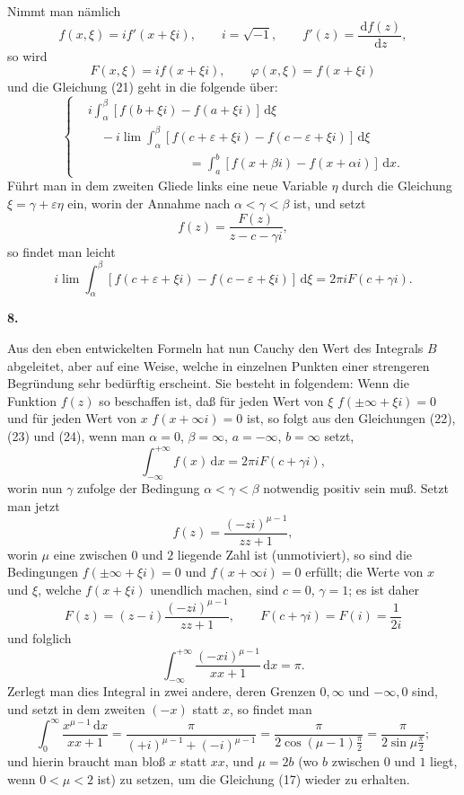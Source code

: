 \documentclass[11pt]{article}
\newcommand{\dd}{\,\mathrm d}
\newcommand{\art}[1]{\bigskip\begin{center}\large\bfseries #1.\end{center}\nopagebreak}
\begin{document}
Nimmt man nämlich
\[
f(x,\xi)=i f'(x+\xi i), \qquad i=\sqrt{-1}, \qquad f'(z)=\frac{\dd f(z)}{\dd z},
\]
so wird
\[
F(x,\xi)=i f(x+\xi i),\qquad \varphi(x,\xi)=f(x+\xi i)
\]
und die Gleichung (21) geht in die folgende über:
\begin{equation}
\left\{
\begin{aligned}
&i\int_\alpha^\beta [f(b+\xi i)-f(a+\xi i)]\dd\xi \\
&\quad -i\lim\int_\alpha^\beta [f(c+\varepsilon+\xi i)-f(c-\varepsilon+\xi i)]\dd\xi \\
&\hspace{8em}=\int_a^b [f(x+\beta i)-f(x+\alpha i)]\dd x .
\end{aligned}
\right.
\tag{22}
\end{equation}
Führt man in dem zweiten Gliede links eine neue Variable $\eta$ durch die Gleichung $\xi=\gamma+\varepsilon\eta$ ein, worin der Annahme nach $\alpha<\gamma<\beta$ ist, und setzt
\begin{equation}
f(z)=\frac{F(z)}{z-c-\gamma i},
\tag{23}
\end{equation}
so findet man leicht
\begin{equation}
i\lim\int_\alpha^\beta [f(c+\varepsilon+\xi i)-f(c-\varepsilon+\xi i)]\dd\xi=2\pi i F(c+\gamma i).
\tag{24}
\end{equation}

\art{8}

Aus den eben entwickelten Formeln hat nun Cauchy den Wert des Integrals $B$ abgeleitet, aber auf eine Weise, welche in einzelnen Punkten einer strengeren Begründung sehr bedürftig erscheint. Sie besteht in folgendem: Wenn die Funktion $f(z)$ so beschaffen ist, daß für jeden Wert von $\xi$ $f(\pm\infty+\xi i)=0$ und für jeden Wert von $x$ $f(x+\infty i)=0$ ist, so folgt aus den Gleichungen (22), (23) und (24), wenn man $\alpha=0$, $\beta=\infty$, $a=-\infty$, $b=\infty$ setzt,
\begin{equation}
\int_{-\infty}^{+\infty} f(x)\dd x=2\pi i F(c+\gamma i),
\tag{25}
\end{equation}
worin nun $\gamma$ zufolge der Bedingung $\alpha<\gamma<\beta$ notwendig positiv sein muß. Setzt man jetzt
\[
f(z)=\frac{(-zi)^{\mu-1}}{zz+1},
\]
worin $\mu$ eine zwischen $0$ und $2$ liegende Zahl ist (unmotiviert), so sind die Bedingungen $f(\pm\infty+\xi i)=0$ und $f(x+\infty i)=0$ erfüllt; die Werte von $x$ und $\xi$, welche $f(x+\xi i)$ unendlich machen, sind $c=0$, $\gamma=1$; es ist daher
\[
F(z)=(z-i)\frac{(-zi)^{\mu-1}}{zz+1},\qquad F(c+\gamma i)=F(i)=\frac1{2i}
\]
und folglich
\begin{equation}
\int_{-\infty}^{+\infty}\frac{(-xi)^{\mu-1}}{xx+1}\dd x=\pi.
\tag{26}
\end{equation}
Zerlegt man dies Integral in zwei andere, deren Grenzen $0,\infty$ und $-\infty,0$ sind, und setzt in dem zweiten $(-x)$ statt $x$, so findet man
\[
\int_0^\infty\frac{x^{\mu-1}\dd x}{xx+1}
=\frac{\pi}{(+i)^{\mu-1}+(-i)^{\mu-1}}
=\frac{\pi}{2\cos(\mu-1)\frac{\pi}{2}}
=\frac{\pi}{2\sin\mu\frac{\pi}{2}};
\]
und hierin braucht man bloß $x$ statt $xx$, und $\mu=2b$ (wo $b$ zwischen $0$ und $1$ liegt, wenn $0<\mu<2$ ist) zu setzen, um die Gleichung (17) wieder zu erhalten.
\end{document}
